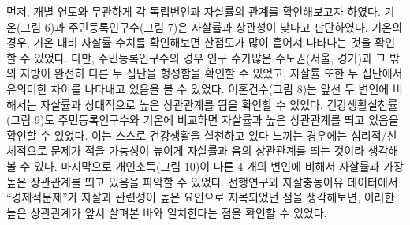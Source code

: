 \documentclass[a4paper, 11pt]{oblivoir}
\begin{document}
    먼저, 개별 연도와 무관하게 각 독립변인과 자살률의 관계를 확인해보고자 하였다. 
    기온(그림 6)과 주민등록인구수(그림 7)은 자살률과 상관성이 낮다고 판단하였다. 기온의 경우, 기온 대비 자살률 수치를 확인해보면
    산점도가 많이 흩어져 나타나는 것을 확인할 수 있었다. 다만, 주민등록인구수의 경우 인구 수가많은 수도권(서울, 경기)과 그 밖의 지방이
    완전히 다른 두 집단을 형성함을 확인할 수 있었고, 자살률 또한 두 집단에서 유의미한 차이를 나타내고 있음을 볼 수 있었다. 
    이혼건수(그림 8)는 앞선 두 변인에 비해서는 자살률과 상대적으로 높은 상관관계를 띔을 확인할 수 있었다. 
    건강생활실천률(그림 9)도 주민등록인구수와 기온에 비교하면 자살률과 높은 상관관계를 띄고 있음을 확인할 수 있었다. 이는 
    스스로 건강생활을 실천하고 있다 느끼는 경우에는 심리적/신체적으로 문제가 적을 가능성이 높이게 자살률과 음의 상관관계를 띄는 것이라 
    생각해볼 수 있다. 마지막으로 개인소득(그림 10)이 다른 4 개의 변인에 비해서 자살률과 가장 높은 상관관계를 띄고 있음을 파악할 수 있었다. 
    선행연구와 자살충동이유 데이터에서 ``경제적문제''가 자살과 관련성이 높은 요인으로 지목되었던 점을 생각해보면, 이러한 높은 상관관계가 
    앞서 살펴본 바와 일치한다는 점을 확인할 수 있었다. 
    \newpage    
\end{document}
